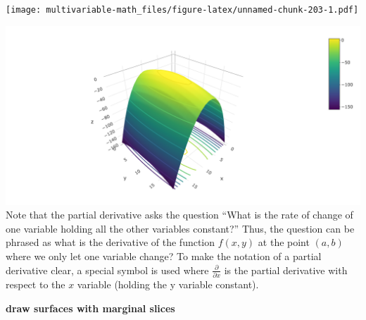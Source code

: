 \documentclass[
]{book}
\newenvironment{Shaded}{\begin{snugshade}}{\end{snugshade}}
\newcommand{\DataTypeTok}[1]{\textcolor[rgb]{0.13,0.29,0.53}{#1}}
\newcommand{\DecValTok}[1]{\textcolor[rgb]{0.00,0.00,0.81}{#1}}
\newcommand{\KeywordTok}[1]{\textcolor[rgb]{0.13,0.29,0.53}{\textbf{#1}}}
\newcommand{\NormalTok}[1]{#1}
\newcommand{\OperatorTok}[1]{\textcolor[rgb]{0.81,0.36,0.00}{\textbf{#1}}}
\newcommand{\OtherTok}[1]{\textcolor[rgb]{0.56,0.35,0.01}{#1}}
\newcommand{\StringTok}[1]{\textcolor[rgb]{0.31,0.60,0.02}{#1}}
\theoremstyle{definition}
\theoremstyle{definition}
\theoremstyle{definition}
\theoremstyle{definition}
\theoremstyle{remark}
\begin{document}
\texttt{[image: multivariable-math\_files/figure-latex/unnamed-chunk-203-1.pdf]}

\begin{Shaded}
\end{Shaded}

\includegraphics[width=1\linewidth]{./webshot-images/contour}
Note that the partial derivative asks the question ``What is the rate of change of one variable holding all the other variables constant?'' Thus, the question can be phrased as what is the derivative of the function \(f(x, y)\) at the point \((a, b)\) where we only let one variable change? To make the notation of a partial derivative clear, a special symbol is used where \(\frac{\partial}{\partial x}\) is the partial derivative with respect to the \(x\) variable (holding the y variable constant).

\textbf{draw surfaces with marginal slices}
\end{document}
